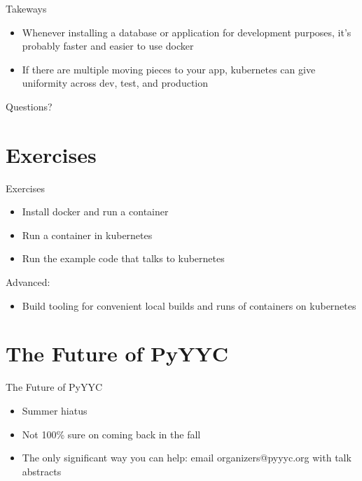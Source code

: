\documentclass[xcolor=svgnames,17pt]{beamer}
\begin{document}
\begin{frame}
\tableofcontents[currentsection]
\end{frame}

\begin{frame}{Takeways}
\begin{itemize}
\item Whenever installing a database or application for development
purposes, it’s probably faster and easier to use docker
\pause
\item If there are multiple moving pieces to your app, kubernetes can give
uniformity across dev, test, and production
\end{itemize}
\pause
Questions?
\end{frame}

\section{Exercises}

\begin{frame}
\tableofcontents[currentsection]
\end{frame}

\begin{frame}{Exercises}
\begin{itemize}
\item Install docker and run a container
\item Run a container in kubernetes
\item Run the example code that talks to kubernetes
\end{itemize}
Advanced:
\begin{itemize}
\item Build tooling for convenient local builds and runs of containers on
kubernetes
\end{itemize}
\end{frame}

\section{The Future of PyYYC}

\begin{frame}
\tableofcontents[currentsection]
\end{frame}

\begin{frame}{The Future of PyYYC}
\begin{itemize}
\item Summer hiatus
\item Not 100\% sure on coming back in the fall
\item The only significant way you can help: email organizers@pyyyc.org
with talk abstracts
\end{itemize}
\end{frame}
\end{document}
